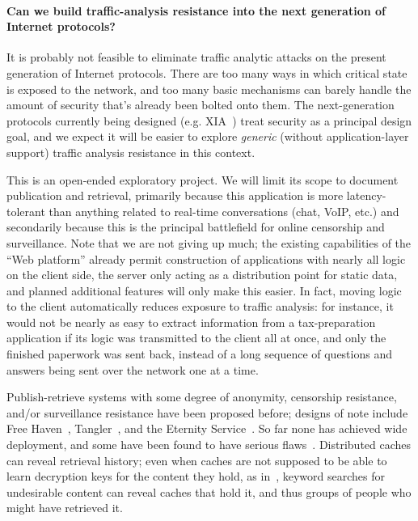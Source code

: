 \documentclass[oneside]{zarticle}
\begin{document}
\paragraph{Can we build traffic-analysis resistance into the next
generation of Internet protocols?}  It is probably not feasible to
eliminate traffic analytic attacks on the present generation of
Internet protocols.  There are too many ways in which critical state
is exposed to the network, and too many basic mechanisms can barely
handle the amount of security that's already been bolted onto them.
The next-generation protocols currently being designed
(e.g. XIA~\cite{xia2013xia}) treat security as a principal design
goal, and we expect it will be easier to explore \emph{generic}
(without application-layer support) traffic analysis resistance in
this context.

This is an open-ended exploratory project.  We will limit its scope to
document publication and retrieval, primarily because this application
is more latency-tolerant than anything related to real-time
conversations (chat, VoIP, etc.) and secondarily because this is the
principal battlefield for online censorship and surveillance.  Note
that we are not giving up much; the existing capabilities of the “Web
platform” already permit construction of applications with nearly all
logic on the client side, the server only acting as a distribution
point for static data, and planned additional features will only make
this easier.  In fact, moving logic to the client automatically
reduces exposure to traffic analysis: for instance, it would not be
nearly as easy to extract information from a tax-preparation
application if its logic was transmitted to the client all at once,
and only the finished paperwork was sent back, instead of a long
sequence of questions and answers being sent over the network one at a
time.

Publish-retrieve systems with some degree of anonymity, censorship
resistance, and/or surveillance resistance have been proposed before;
designs of note include Free Haven~\cite{dingledine2000freehaven},
Tangler~\cite{waldman2001tangler}, and the Eternity
Service~\cite{anderson1996eternity, benes2001strongeternity}. So far
none has achieved wide deployment, and some have been found to have
serious flaws~\cite{kugler2003gnunet}.  Distributed caches can reveal
retrieval history; even when caches are not supposed to be able to
learn decryption keys for the content they hold, as
in~\textcite{serjantov2002anonymizing}, keyword searches for
undesirable content can reveal caches that hold it, and thus groups of
people who might have retrieved it.
\end{document}
